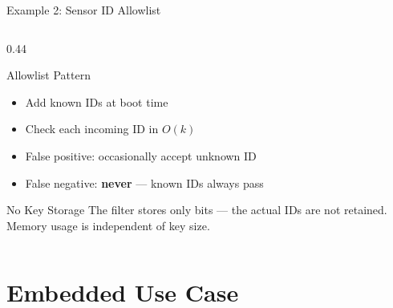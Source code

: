 \documentclass[aspectratio=169, 10pt]{beamer}
\begin{document}
\begin{frame}[fragile]{Example 2: Sensor ID Allowlist}
\begin{columns}[T]
\begin{column}{0.44\textwidth}
\vspace{0.5em}
\begin{block}{Allowlist Pattern}
\begin{itemize}
  \item Add known IDs at boot time
  \item Check each incoming ID in $O(k)$
  \item False positive: occasionally accept unknown ID
  \item False negative: \textbf{never} --- known IDs always pass
\end{itemize}
\end{block}

\begin{alertblock}{No Key Storage}
The filter stores only bits --- the actual IDs are not
retained. Memory usage is independent of key size.
\end{alertblock}
\end{column}
\end{columns}
\end{frame}

\section{Embedded Use Case}
\end{document}
